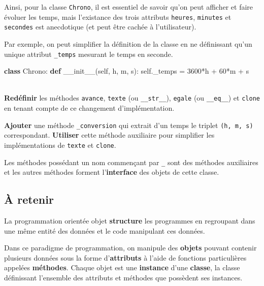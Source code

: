 \documentclass[a4paper,17pt]{extarticle}
\newenvironment{eleve}%
{\begin{activite}\color{noiramu}\\[-0.5cm]}
{\end{activite}}
\newenvironment{Shaded}{}{}
\newcommand{\KeywordTok}[1]{\textcolor[rgb]{0.00,0.44,0.13}{\textbf{{#1}}}}
\newcommand{\DecValTok}[1]{\textcolor[rgb]{0.25,0.63,0.44}{{#1}}}
\newcommand{\FunctionTok}[1]{\textcolor[rgb]{0.02,0.16,0.49}{{#1}}}
\newcommand{\NormalTok}[1]{{#1}}
\newcommand{\VariableTok}[1]{\textcolor[rgb]{0.10,0.09,0.49}{{#1}}}
\newcommand{\OperatorTok}[1]{\textcolor[rgb]{0.40,0.40,0.40}{{#1}}}
\begin{document}
    Ainsi, pour la classe \texttt{Chrono}, il est essentiel de savoir qu'on
peut afficher et faire évoluer les temps, mais l'existance des trois
attributs \texttt{heures}, \texttt{minutes} et \texttt{secondes} est
anecdotique (et peut être cachée à l'utilisateur).
\begin{exemple}
    Par exemple, on peut simplifier la définition de la classe en ne
définissant qu'un unique attribut \texttt{\_temps} mesurant le temps en
seconde.

\begin{Shaded}
\begin{Highlighting}[]
\KeywordTok{class}\NormalTok{ Chrono:}
    \KeywordTok{def} \FunctionTok{\_\_init\_\_}\NormalTok{(}\VariableTok{self}\NormalTok{, h, m, s):}
        \VariableTok{self}\NormalTok{.\_temps }\OperatorTok{=} \DecValTok{3600}\OperatorTok{*}\NormalTok{h }\OperatorTok{+} \DecValTok{60}\OperatorTok{*}\NormalTok{m }\OperatorTok{+}\NormalTok{ s}
\end{Highlighting}
\end{Shaded}

        \end{exemple}\begin{eleve}
    \textbf{Redéfinir} les méthodes \texttt{avance}, \texttt{texte} (ou
\texttt{\_\_str\_\_}), \texttt{egale} (ou \texttt{\_\_eq\_\_}) et
\texttt{clone} en tenant compte de ce changement d'implémentation.

\textbf{Ajouter} une méthode \texttt{\_conversion} qui extrait d'un
temps le triplet \texttt{(h,\ m,\ s)} correspondant. \textbf{Utiliser}
cette méthode auxiliaire pour simplifier les implémentations de
\texttt{texte} et \texttt{clone}.
        
        \end{eleve}\begin{remarque}
    Les méthodes possédant un nom commençant par \texttt{\_} sont des
méthodes auxiliaires et les autres méthodes forment l'\textbf{interface}
des objets de cette classe.

        \end{remarque}
    \hypertarget{uxe0-retenir}{%
\subsection{À retenir}\label{uxe0-retenir}}
\begin{retenir}
    La programmation orientée objet \textbf{structure} les programmes en
regroupant dans une même entité des données et le code manipulant ces
données.

Dans ce paradigme de programmation, on manipule des \textbf{objets}
pouvant contenir plusieurs données sous la forme d'\textbf{attributs} à
l'aide de fonctions particulières appelées \textbf{méthodes}. Chaque
objet est une \textbf{instance} d'une \textbf{classe}, la classe
définissant l'ensemble des attributs et méthodes que possèdent ses
instances.

        \end{retenir}

    
    
    
\end{document}
